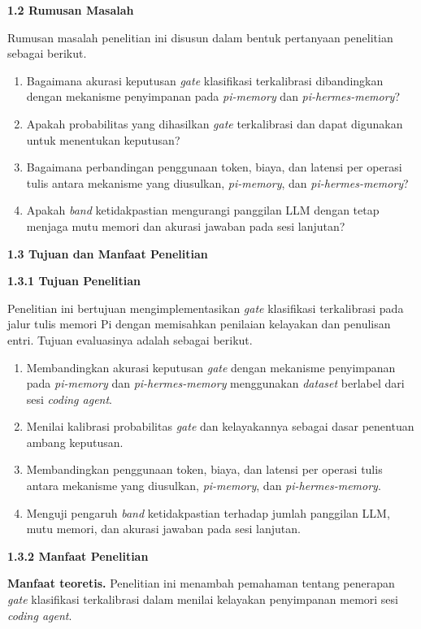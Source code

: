 \documentclass[12pt,a4paper]{article}
\newcommand{\asing}[1]{\textit{#1}}
\newcommand{\pim}{\textit{pi-memory}}
\newcommand{\phm}{\textit{pi-hermes-memory}}
\newcommand{\subbab}[2]{%
  \par\vspace{0.8em}\phantomsection\label{#2}%
  \noindent\textbf{#1}\par\nopagebreak\vspace{0.3em}}
\newcommand{\subsubbab}[2]{%
  \par\vspace{0.5em}\phantomsection\label{#2}%
  \noindent\textbf{#1}\par\nopagebreak\vspace{0.2em}}
\begin{document}
\subbab{1.2 Rumusan Masalah}{sec:1.2}

Rumusan masalah penelitian ini disusun dalam bentuk pertanyaan penelitian sebagai berikut.
\begin{enumerate}[leftmargin=1.25cm]
\item Bagaimana akurasi keputusan \asing{gate} klasifikasi terkalibrasi dibandingkan dengan mekanisme penyimpanan pada \pim{} dan \phm{}?
\item Apakah probabilitas yang dihasilkan \asing{gate} terkalibrasi dan dapat digunakan untuk menentukan keputusan?
\item Bagaimana perbandingan penggunaan token, biaya, dan latensi per operasi tulis antara mekanisme yang diusulkan, \pim{}, dan \phm{}?
\item Apakah \asing{band} ketidakpastian mengurangi panggilan LLM dengan tetap menjaga mutu memori dan akurasi jawaban pada sesi lanjutan?
\end{enumerate}

\subbab{1.3 Tujuan dan Manfaat Penelitian}{sec:1.3}

\subsubbab{1.3.1 Tujuan Penelitian}{sec:1.3.1}

Penelitian ini bertujuan mengimplementasikan \asing{gate} klasifikasi terkalibrasi pada jalur tulis memori Pi dengan memisahkan penilaian kelayakan dan penulisan entri. Tujuan evaluasinya adalah sebagai berikut.
\begin{enumerate}[leftmargin=1.25cm]
\item Membandingkan akurasi keputusan \asing{gate} dengan mekanisme penyimpanan pada \pim{} dan \phm{} menggunakan \asing{dataset} berlabel dari sesi \asing{coding agent}.
\item Menilai kalibrasi probabilitas \asing{gate} dan kelayakannya sebagai dasar penentuan ambang keputusan.
\item Membandingkan penggunaan token, biaya, dan latensi per operasi tulis antara mekanisme yang diusulkan, \pim{}, dan \phm{}.
\item Menguji pengaruh \asing{band} ketidakpastian terhadap jumlah panggilan LLM, mutu memori, dan akurasi jawaban pada sesi lanjutan.
\end{enumerate}

\subsubbab{1.3.2 Manfaat Penelitian}{sec:1.3.2}

\textbf{Manfaat teoretis.} Penelitian ini menambah pemahaman tentang penerapan \asing{gate} klasifikasi terkalibrasi dalam menilai kelayakan penyimpanan memori sesi \asing{coding agent}.
\end{document}
